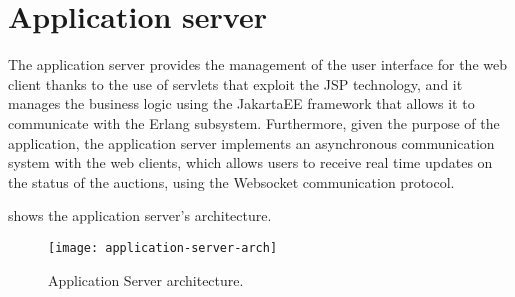 \section{Application server}\label{sec:archserver}

The application server provides the management of the user interface for the web
client thanks to the use of servlets that exploit the JSP technology, and it
manages the business logic using the JakartaEE framework that allows it to
communicate with the Erlang subsystem. Furthermore, given the purpose of the
application, the application server implements an asynchronous communication
system with the web clients, which allows users to receive real time updates on
the status of the auctions, using the Websocket communication protocol.

 shows the application server's
architecture.

\begin{figure}[htb]
	\centering
	\texttt{[image: application-server-arch]}
	\caption{Application Server
	architecture.}\label{fig:application-server-arch}
\end{figure}




